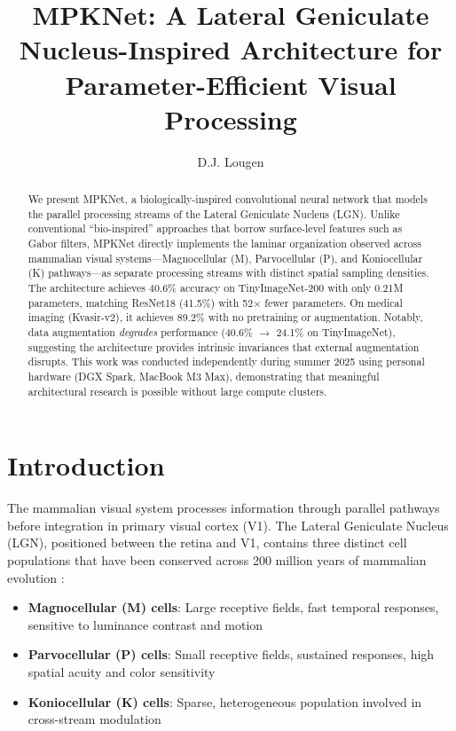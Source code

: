 \documentclass[11pt]{article}
\title{MPKNet: A Lateral Geniculate Nucleus-Inspired Architecture for Parameter-Efficient Visual Processing}
\author[1]{D.J. Lougen}
\affil[1]{University of Toronto \\ \texttt{d.lougen@mail.utoronto.ca}}
\date{}
\begin{document}
\maketitle

\begin{abstract}
We present MPKNet, a biologically-inspired convolutional neural network that models the parallel processing streams of the Lateral Geniculate Nucleus (LGN). Unlike conventional ``bio-inspired'' approaches that borrow surface-level features such as Gabor filters, MPKNet directly implements the laminar organization observed across mammalian visual systems---Magnocellular (M), Parvocellular (P), and Koniocellular (K) pathways---as separate processing streams with distinct spatial sampling densities. The architecture achieves 40.6\% accuracy on TinyImageNet-200 with only 0.21M parameters, matching ResNet18 (41.5\%) with 52$\times$ fewer parameters. On medical imaging (Kvasir-v2), it achieves 89.2\% with no pretraining or augmentation. Notably, data augmentation \textit{degrades} performance (40.6\% $\rightarrow$ 24.1\% on TinyImageNet), suggesting the architecture provides intrinsic invariances that external augmentation disrupts. This work was conducted independently during summer 2025 using personal hardware (DGX Spark, MacBook M3 Max), demonstrating that meaningful architectural research is possible without large compute clusters.
\end{abstract}

\section{Introduction}

The mammalian visual system processes information through parallel pathways before integration in primary visual cortex (V1). The Lateral Geniculate Nucleus (LGN), positioned between the retina and V1, contains three distinct cell populations that have been conserved across 200 million years of mammalian evolution \citep{solomon2021parallel}:

\begin{itemize}
    \item \textbf{Magnocellular (M) cells}: Large receptive fields, fast temporal responses, sensitive to luminance contrast and motion
    \item \textbf{Parvocellular (P) cells}: Small receptive fields, sustained responses, high spatial acuity and color sensitivity
    \item \textbf{Koniocellular (K) cells}: Sparse, heterogeneous population involved in cross-stream modulation
\end{itemize}
\end{document}

